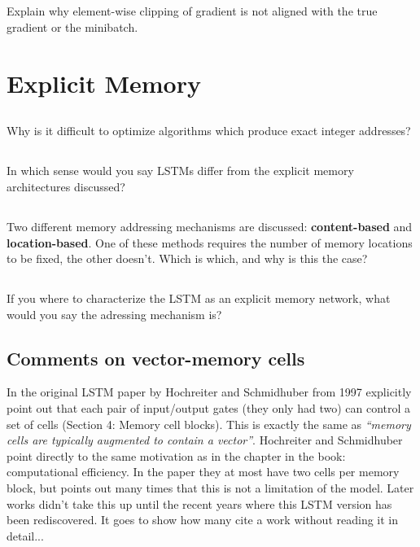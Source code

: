 \documentclass[a4paper]{report} \usepackage{amsmath}
\begin{document}
    \subsection{}
    Explain why element-wise clipping of gradient is not aligned with
    the true gradient or the minibatch.

    \section{Explicit Memory}
    \subsection{}
    Why is it difficult to optimize algorithms which produce exact
    integer addresses?

    \subsection{}
    In which sense would you say LSTMs differ from the explicit memory
    architectures discussed?

    \subsection{}
    Two different memory addressing mechanisms are discussed:
    \textbf{content-based} and \textbf{location-based}. One of these
    methods requires the number of memory locations to be fixed, the
    other doesn't. Which is which, and why is this the case?

    \subsection{}
    If you where to characterize the LSTM as an explicit memory
    network, what would you say the adressing mechanism is?

    \subsection*{Comments on vector-memory cells}
    In the original LSTM paper by Hochreiter and Schmidhuber from 1997
    explicitly point out that each pair of input/output gates (they
    only had two) can control a set of cells (Section 4: Memory cell
    blocks). This is exactly the same as \emph{``memory cells are
      typically augmented to contain a vector''}. Hochreiter and
    Schmidhuber point directly to the same motivation as in the
    chapter in the book: computational efficiency.  In the paper they
    at most have two cells per memory block, but points out many times
    that this is not a limitation of the model. Later works didn't
    take this up until the recent years where this LSTM version has
    been rediscovered. It goes to show how many cite a work without
    reading it in detail...
\end{document}
